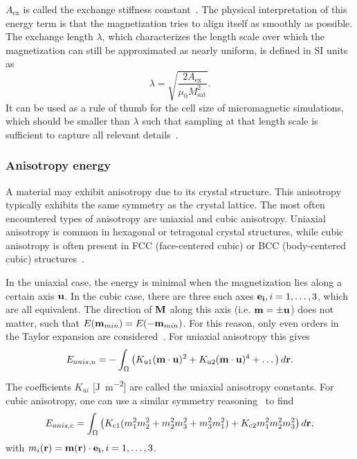 \documentclass[11pt,a4paper,english]{article}
\begin{document}
$A_\mathrm{ex}$ is called the exchange stiffness constant~\cite{Gilbert1956}. The physical interpretation of this energy term is that the magnetization tries to align itself as smoothly as possible.
The exchange length $\lambda$, which characterizes the length scale over which the magnetization can still be approximated as nearly uniform, is defined in SI units \cite{ExchangeLength, ExchangeLength_original, MuMax3} as
\begin{equation}
    \lambda = \sqrt{\frac{2 A_\mathrm{ex}}{\mu_0 M_\mathrm{sat}^2}} \mathrm{.}
    \label{eq:Energy_ExchangeEnergy_ExchangeLength}
\end{equation}
It can be used as a rule of thumb for the cell size of micromagnetic simulations, which should be smaller than $\lambda$ such that sampling at that length scale is sufficient to capture all relevant details~\cite{ExchangeLength}.

\subsubsection{Anisotropy energy}
A material may exhibit anisotropy due to its crystal structure. This anisotropy typically exhibits the same symmetry as the crystal lattice. The most often encountered types of anisotropy are uniaxial and cubic anisotropy. Uniaxial anisotropy is common in hexagonal or tetragonal crystal structures, while cubic anisotropy is often present in FCC (face-centered cubic) or BCC (body-centered cubic) structures~\cite{Gilbert1956, abert2013discrete}. \par
In the uniaxial case, the energy is minimal when the magnetization lies along a certain axis $\vb{u}$. In the cubic case, there are three such axes $\vb{e_i}, i=1,\dots,3$, which are all equivalent. The direction of $\vb{M}$ along this axis (i.e. $\vb{m}=\pm \vb{u}$) does not matter, such that $E(\vb{m}_{min}) = E(-\vb{m}_{min})$. For this reason, only even orders in the Taylor expansion are considered~\cite{abert2013discrete}. For uniaxial anisotropy this gives
\begin{equation}
    E_{anis,u} = - \int_\Omega \big(K_\mathrm{u1} (\vb{m} \cdot \vb{u})^2 + K_\mathrm{u2} (\vb{m} \cdot \vb{u})^4 + \dots\big) \, d\vb{r} \mathrm{.} \label{eq:Energy_Term_AnisUniaxial}
\end{equation}
The coefficients $K_{ui}$ [\si{\joule\per\metre\squared}] are called the uniaxial anisotropy constants.
For cubic anisotropy, one can use a similar symmetry reasoning~\cite{abert2013discrete} to find
\begin{equation}
    E_{anis,c} = \int_\Omega \big(K_\mathrm{c1} (m_1^2m_2^2 + m_2^2m_3^2 + m_3^2m_1^2) + K_\mathrm{c2} m_1^2m_2^2m_3^2\big) \, d\vb{r} \mathrm{,} \label{eq:Energy_Term_AnisCubic}
\end{equation}
with $m_i(\vb{r}) = \vb{m}(\vb{r}) \cdot \vb{e_i}, i=1,\dots,3$.
\end{document}
